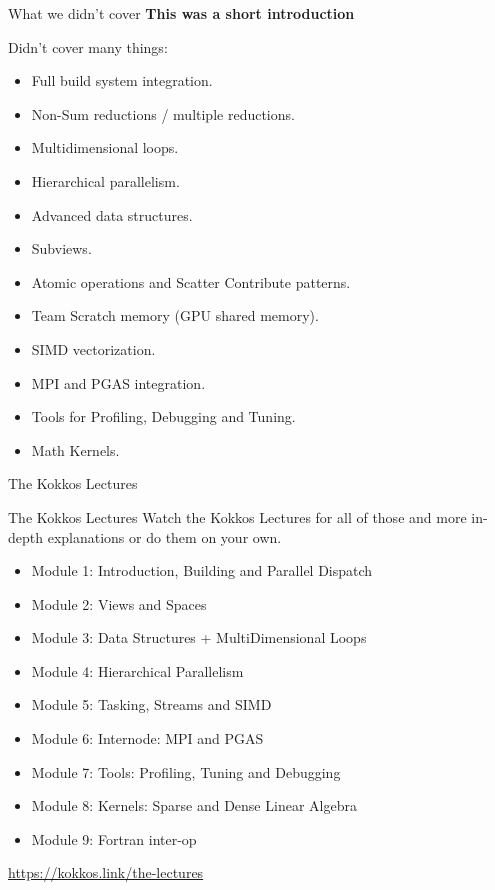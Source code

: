 \begin{frame}[fragile]{What we didn't cover}
	\textbf{This was a short introduction}
	
	Didn't cover many things:
	\begin{itemize}
		\item Full build system integration.
		\item Non-Sum reductions / multiple reductions.
		\item Multidimensional loops.
                \item Hierarchical parallelism.
		\item Advanced data structures.
		\item Subviews.
		\item Atomic operations and Scatter Contribute patterns.
		\item Team Scratch memory (GPU shared memory).
		\item SIMD vectorization.
		\item MPI and PGAS integration.
		\item Tools for Profiling, Debugging and Tuning.
		\item Math Kernels.
	\end{itemize}

\end{frame}

\begin{frame}{The Kokkos Lectures}
        
	\begin{block}{The Kokkos Lectures}
		Watch the Kokkos Lectures for all of those and more in-depth explanations or do them on your own.
	\end{block}

\begin{itemize}
	\item Module 1: Introduction, Building and Parallel Dispatch
	\item Module 2: Views and Spaces
	\item Module 3: Data Structures + MultiDimensional Loops
	\item Module 4: Hierarchical Parallelism
	\item Module 5: Tasking, Streams and SIMD
	\item Module 6: Internode: MPI and PGAS
	\item Module 7: Tools: Profiling, Tuning and Debugging
	\item Module 8: Kernels: Sparse and Dense Linear Algebra
    \item Module 9: Fortran inter-op
\end{itemize}

\begin{center}
\url{https://kokkos.link/the-lectures}
\end{center}

\end{frame}


